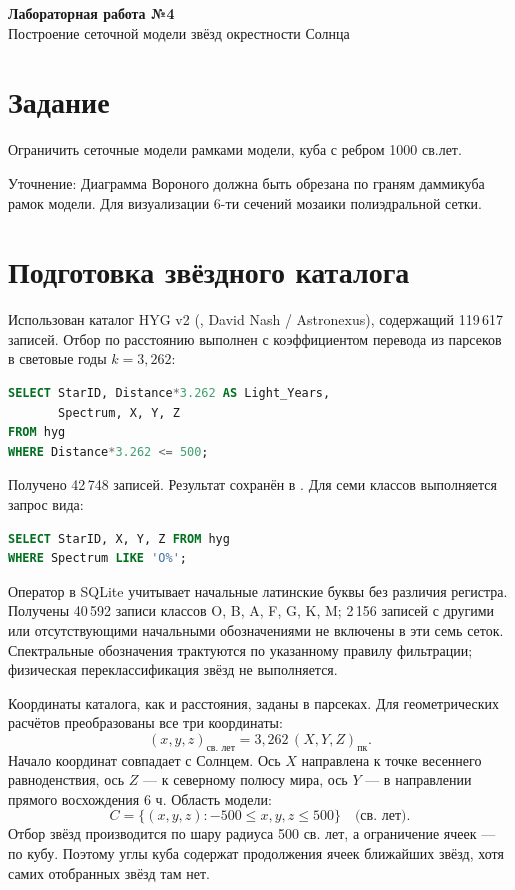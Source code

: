 
\begin{center}
\textbf{Лабораторная работа №4}\\[4pt]
Построение сеточной модели звёзд окрестности Солнца
\end{center}

\section{Задание}
Ограничить сеточные модели рамками модели, куба с ребром 1000 св.лет.

Уточнение: Диаграмма Вороного должна быть обрезана по граням даммикуба рамок модели. Для визуализации 6-ти сечений мозаики полиэдральной сетки.

\section{Подготовка звёздного каталога}
Использован каталог HYG v2 (, David Nash / Astronexus), содержащий 119\,617 записей. Отбор по расстоянию выполнен с коэффициентом перевода из парсеков в световые годы $k=3{,}262$:
\begin{lstlisting}[language=SQL]
SELECT StarID, Distance*3.262 AS Light_Years,
       Spectrum, X, Y, Z
FROM hyg
WHERE Distance*3.262 <= 500;
\end{lstlisting}
Получено 42\,748 записей. Результат сохранён в . Для семи классов выполняется запрос вида:
\begin{lstlisting}[language=SQL]
SELECT StarID, X, Y, Z FROM hyg
WHERE Spectrum LIKE 'O%';
\end{lstlisting}
Оператор  в SQLite учитывает начальные латинские буквы без различия регистра. Получены 40\,592 записи классов O, B, A, F, G, K, M; 2\,156 записей с другими или отсутствующими начальными обозначениями не включены в эти семь сеток. Спектральные обозначения трактуются по указанному правилу фильтрации; физическая переклассификация звёзд не выполняется.

Координаты каталога, как и расстояния, заданы в парсеках. Для геометрических расчётов преобразованы все три координаты:
\[
 (x,y,z)_{\text{св. лет}}=3{,}262\,(X,Y,Z)_{\text{пк}}.
\]
Начало координат совпадает с Солнцем. Ось $X$ направлена к точке весеннего равноденствия, ось $Z$ --- к северному полюсу мира, ось $Y$ --- в направлении прямого восхождения $6$ ч. Область модели:
\[
 C=\{(x,y,z): -500\leq x,y,z\leq500\}\quad\text{(св. лет)}.
\]
Отбор звёзд производится по шару радиуса 500 св. лет, а ограничение ячеек --- по кубу. Поэтому углы куба содержат продолжения ячеек ближайших звёзд, хотя самих отобранных звёзд там нет.

